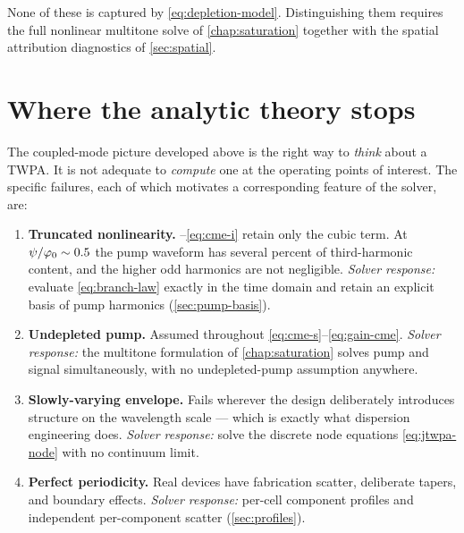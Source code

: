 None of these is captured by \eqref{eq:depletion-model}. Distinguishing them
requires the full nonlinear multitone solve of \cref{chap:saturation} together
with the spatial attribution diagnostics of \cref{sec:spatial}.

\section{Where the analytic theory stops}
\label{sec:where-theory-stops}

The coupled-mode picture developed above is the right way to \emph{think} about
a TWPA. It is not adequate to \emph{compute} one at the operating points of
interest. The specific failures, each of which motivates a corresponding feature
of the solver, are:

\begin{enumerate}
\item \textbf{Truncated nonlinearity.} --\eqref{eq:cme-i} retain
      only the cubic term. At $\psi/\varphi_{0}\sim 0.5$ the pump waveform has
      several percent of third-harmonic content, and the higher odd harmonics
      are not negligible.
      \emph{Solver response:} evaluate \eqref{eq:branch-law} exactly in the time
      domain and retain an explicit basis of pump harmonics
      (\cref{sec:pump-basis}).

\item \textbf{Undepleted pump.} Assumed throughout
      \eqref{eq:cme-s}--\eqref{eq:gain-cme}.
      \emph{Solver response:} the multitone formulation of
      \cref{chap:saturation} solves pump and signal simultaneously, with no
      undepleted-pump assumption anywhere.

\item \textbf{Slowly-varying envelope.} Fails wherever the design deliberately
      introduces structure on the wavelength scale --- which is exactly what
      dispersion engineering does.
      \emph{Solver response:} solve the discrete node equations
      \eqref{eq:jtwpa-node} with no continuum limit.

\item \textbf{Perfect periodicity.} Real devices have fabrication scatter,
      deliberate tapers, and boundary effects.
      \emph{Solver response:} per-cell component profiles and independent
      per-component scatter (\cref{sec:profiles}).


\end{enumerate}
